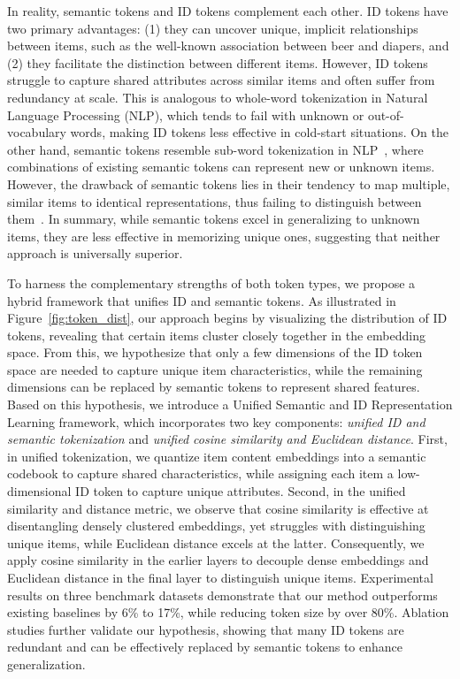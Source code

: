In reality, semantic tokens and ID tokens complement each other. ID tokens have two primary advantages: (1) they can uncover unique, implicit relationships between items, such as the well-known association between beer and diapers, and (2) they facilitate the distinction between different items. However, ID tokens struggle to capture shared attributes across similar items and often suffer from redundancy at scale. This is analogous to whole-word tokenization in Natural Language Processing (NLP)\citep{NIPS2000_728f206c, collobert2008unified, mikolov2013distributed}, which tends to fail with unknown or out-of-vocabulary words\citep{mielke2021between}, making ID tokens less effective in cold-start situations. On the other hand, semantic tokens resemble sub-word tokenization in NLP~\citep{mikolov2012subword, wang2020neural}, where combinations of existing semantic tokens can represent new or unknown items. However, the drawback of semantic tokens lies in their tendency to map multiple, similar items to identical representations, thus failing to distinguish between them~\citep{singh2023better}. In summary, while semantic tokens excel in generalizing to unknown items, they are less effective in memorizing unique ones, suggesting that neither approach is universally superior.

To harness the complementary strengths of both token types, we propose a hybrid framework that unifies ID and semantic tokens. As illustrated in Figure~\ref{fig:token_dist}, our approach begins by visualizing the distribution of ID tokens, revealing that certain items cluster closely together in the embedding space. From this, we hypothesize that only a few dimensions of the ID token space are needed to capture unique item characteristics, while the remaining dimensions can be replaced by semantic tokens to represent shared features. Based on this hypothesis, we introduce a Unified Semantic and ID Representation Learning framework, which incorporates two key components: \textit{unified ID and semantic tokenization} and \textit{unified cosine similarity and Euclidean distance}. First, in unified tokenization, we quantize item content embeddings into a semantic codebook to capture shared characteristics, while assigning each item a low-dimensional ID token to capture unique attributes. Second, in the unified similarity and distance metric, we observe that cosine similarity is effective at disentangling densely clustered embeddings, yet struggles with distinguishing unique items, while Euclidean distance excels at the latter. Consequently, we apply cosine similarity in the earlier layers to decouple dense embeddings and Euclidean distance in the final layer to distinguish unique items. Experimental results on three benchmark datasets demonstrate that our method outperforms existing baselines by 6\% to 17\%, while reducing token size by over 80\%. Ablation studies further validate our hypothesis, showing that many ID tokens are redundant and can be effectively replaced by semantic tokens to enhance generalization.

